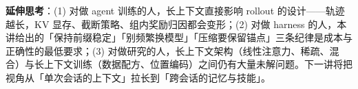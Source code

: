 \documentclass[a4paper]{article}
\begin{document}
\textbf{延伸思考}：(1) 对做 agent 训练的人，长上下文直接影响 rollout 的设计——轨迹越长，KV 显存、截断策略、组内奖励归因都会变形；(2) 对做 harness 的人，本讲给出的「保持前缀稳定」「别频繁换模型」「压缩要保留锚点」三条纪律是成本与正确性的最低要求；(3) 对做研究的人，长上下文架构（线性注意力、稀疏、混合）与长上下文训练（数据配方、位置编码）之间仍有大量未解问题。下一讲将把视角从「单次会话的上下文」拉长到「跨会话的记忆与技能」。
\end{document}
